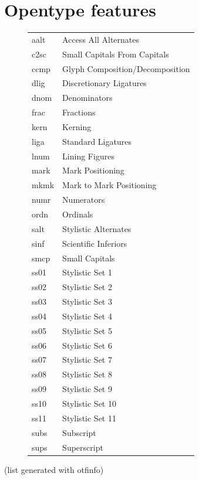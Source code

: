 \documentclass[10pt,a4paper,english]{article}
\begin{document}
\newpage
\section{Opentype features}
\label{sec:otfinfo}

\begin{figure}[ht]
	\centering
	\begin{tabular}{>{\ttfamily}l l}
		aalt & Access All Alternates \\
		c2sc & Small Capitals From Capitals \\
		ccmp & Glyph Composition/Decomposition \\
		dlig & Discretionary Ligatures \\
		dnom & Denominators \\
		frac & Fractions \\
		kern & Kerning \\
		liga & Standard Ligatures \\
		lnum & Lining Figures \\
		mark & Mark Positioning \\
		mkmk & Mark to Mark Positioning \\
		numr & Numerators \\
		ordn & Ordinals \\
		salt & Stylistic Alternates \\
		sinf & Scientific Inferiors \\
		smcp & Small Capitals \\
		ss01 & Stylistic Set 1 \\
		ss02 & Stylistic Set 2 \\
		ss03 & Stylistic Set 3 \\
		ss04 & Stylistic Set 4 \\
		ss05 & Stylistic Set 5 \\
		ss06 & Stylistic Set 6 \\
		ss07 & Stylistic Set 7 \\
		ss08 & Stylistic Set 8 \\
		ss09 & Stylistic Set 9 \\
		ss10 & Stylistic Set 10 \\
		ss11 & Stylistic Set 11 \\
		subs & Subscript \\
		sups & Superscript \\
	\end{tabular}
\end{figure}
(list generated with otfinfo)
\end{document}
